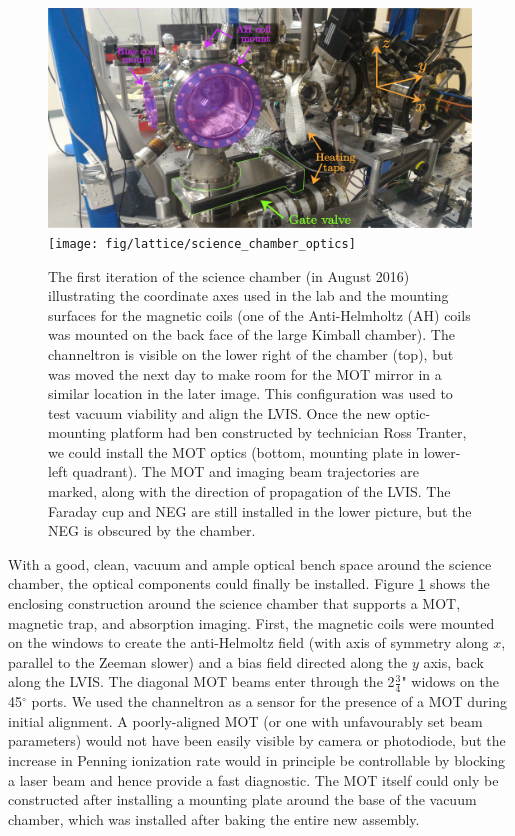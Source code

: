 	\begin{figure}
		\includegraphics[width=\textwidth]{fig/lattice/science_chamber_oblique} %
		\texttt{[image: fig/lattice/science\_chamber\_optics]} %
		\caption{The first iteration of the science chamber (in August 2016)  illustrating the coordinate axes used in the lab and the mounting surfaces for the magnetic coils (one of the Anti-Helmholtz (AH) coils was mounted on the back face of the large Kimball chamber). 
		The channeltron is visible on the lower right of the chamber (top), but was moved the next day to make room for the MOT mirror in a similar location in the later image.
		This configuration was used to test vacuum viability and align the LVIS.
		Once the new optic-mounting platform had ben constructed by technician Ross Tranter, we could install the MOT optics (bottom, mounting plate in lower-left quadrant).
		The MOT and imaging beam trajectories are marked, along with the direction of propagation of the LVIS.
		The Faraday cup and NEG are still installed in the lower picture, but the NEG is obscured by the chamber.}
		\label{fig:MOT_optics}
	\end{figure}
	With a good, clean, vacuum and ample optical bench space around the science chamber, the optical components could finally be installed.
	Figure \ref{fig:MOT_optics} shows the enclosing construction around the science chamber that supports a MOT, magnetic trap, and absorption imaging.
	First, the magnetic coils were mounted on the windows to create the anti-Helmoltz field (with axis of symmetry along $x$, parallel to the Zeeman slower) and a bias field directed along the $y$ axis, back along the LVIS.
	The diagonal MOT beams enter through the 2$\frac{3}{4}$" widows on the 45$^\circ$ ports.
	We used the channeltron as a sensor for the presence of a MOT during initial alignment.
	A poorly-aligned MOT (or one with unfavourably set beam parameters) would not have been easily visible by camera or photodiode, but the increase in Penning ionization rate would in principle be controllable by blocking a laser beam and hence provide a fast diagnostic.
	The MOT itself could only be constructed after installing a mounting plate around the base of the vacuum chamber, which was installed after baking the entire new assembly.
	


